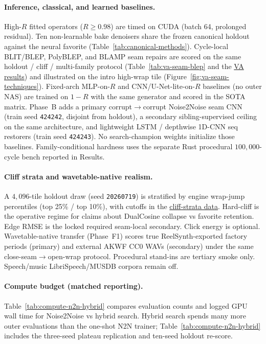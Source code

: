 \paragraph{Inference, classical, and learned baselines.}
High-$R$ fitted operators ($R\ge 0.98$) are timed on CUDA (batch 64, prolonged residual).
Ten non-learnable bake denoisers share the frozen canonical holdout against the neural favorite (Table~\ref{tab:canonical-methods}).
Cycle-local BLIT/BLEP, PolyBLEP, and BLAMP seam repairs are scored on the same holdout / cliff / multi-family protocol (Table~\ref{tab:va-seam-blep} and the \href{https://github.com/reeldemo/denoise-opt}{VA results}) and illustrated on the intro high-wrap tile (Figure~\ref{fig:va-seam-techniques}).
Fixed-arch MLP-on-$R$ and CNN/U-Net-lite-on-$R$ baselines (no outer NAS) are trained on $1{-}R$ with the same generator and scored in the SOTA matrix.
Phase~B adds a primary corrupt$\to$corrupt Noise2Noise seam CNN (train seed \texttt{424242}, disjoint from holdout), a secondary sibling-supervised ceiling on the same architecture, and lightweight LSTM / depthwise 1D-CNN seq restorers (train seed \texttt{424243}).
No search-champion weights initialize those baselines.
Family-conditional hardness uses the separate Rust procedural $100{,}000$-cycle bench reported in Results.

\paragraph{Cliff strata and wavetable-native realism.}
A $4{,}096$-tile holdout draw (seed \texttt{20260719}) is stratified by engine wrap-jump percentiles (top 25\% / top 10\%), with cutoffs in the \href{https://github.com/reeldemo/denoise-opt}{cliff-strata data}.
Hard-cliff is the operative regime for claims about DualCosine collapse vs favorite retention.
Edge RMSE is the locked required seam-local secondary. Click energy is optional.
Wavetable-native transfer (Phase~F1) scores true ReelSynth-exported factory periods (primary) and external AKWF CC0 WAVs (secondary) under the same close-seam$\to$open-wrap protocol.
Procedural stand-ins are tertiary smoke only.
Speech/music LibriSpeech/MUSDB corpora remain off.


\paragraph{Compute budget (matched reporting).}
Table~\ref{tab:compute-n2n-hybrid} compares evaluation counts and logged GPU wall time for Noise2Noise vs hybrid search.
Hybrid search spends many more outer evaluations than the one-shot N2N trainer; Table~\ref{tab:compute-n2n-hybrid} includes the three-seed plateau replication and ten-seed holdout re-score.



